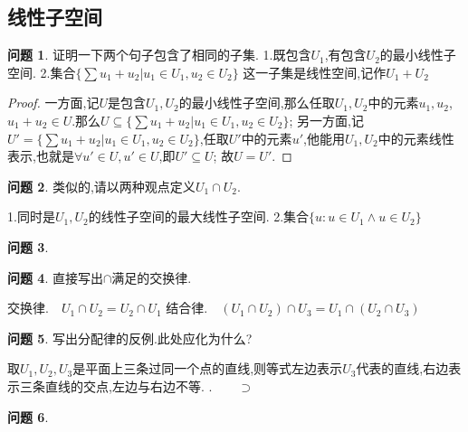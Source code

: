 \documentclass[11pt]{ctexart}
\theoremstyle{definition}
\newtheorem{qqq}{问题}[section]
\numberwithin{equation}{section}
\begin{document}
\subsection{线性子空间}
\begin{qqq}
    证明一下两个句子包含了相同的子集.\newline
    1.既包含$U_1$,有包含$U_2$的最小线性子空间.\newline
    2.集合$\{ \sum u_1+u_2 | u_1 \in U_1 ,u_2 \in U_2 \}$\newline
    这一子集是线性空间,记作$U_1+U_2$ 
\end{qqq}
\begin{proof}
    一方面,记$U$是包含$U_1,U_2$的最小线性子空间,那么任取$U_1,U_2$中的元素$u_1,u_2$,$u_1+u_2 \in U$.那么$U \subseteq\{ \sum u_1+u_2|u_1 \in U_1,u_2 \in U_2 \}$;\newline
    另一方面,记$U'=\{ \sum u_1+u_2|  u_1 \in U_1 ,u_2 \in U_2\}$,任取$U'$中的元素$u'$,他能用$U_1,U_2$中的元素线性表示,也就是$\forall u' \in U,u' \in U$,即$U' \subseteq U$;\newline
    故$U=U'$.
\end{proof}
\begin{qqq}
    类似的,请以两种观点定义$U_1\cap U_2$.
\end{qqq}
\begin{aaa}
    1.同时是$U_1,U_2$的线性子空间的最大线性子空间.\newline
    2.集合$\{ u:u \in U_1 \wedge u \in U_2\}$
\end{aaa}
\begin{qqq}

\end{qqq}
\begin{qqq}
    直接写出$\cap $满足的交换律.
\end{qqq}
\begin{aaa}
    交换律.$\quad U_1 \cap U_2 = U_2\cap U_1$ \newline
    结合律.$\quad (U_1 \cap U_2)\cap U_3 = U_1 \cap (U_2 \cap U_3)$
\end{aaa}
\begin{qqq}
    写出分配律的反例.此处应化为什么?
\end{qqq}
\begin{aaa}
    取$U_1,U_2,U_3$是平面上三条过同一个点的直线,则等式左边表示$U_3$代表的直线,右边表示三条直线的交点,左边与右边不等.\newline
    $.\qquad \supset$ 
\end{aaa}
\begin{qqq}

\end{qqq}
\end{document}
